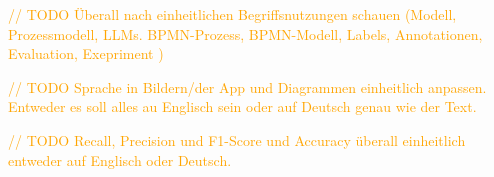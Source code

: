 \textcolor{orange}{// TODO Überall nach einheitlichen Begriffsnutzungen schauen (Modell, Prozessmodell, LLMs. BPMN-Prozess, BPMN-Modell, Labels, Annotationen, Evaluation, Exepriment )}

\textcolor{orange}{// TODO Sprache in Bildern/der App und Diagrammen einheitlich anpassen. Entweder es soll alles au Englisch sein oder auf Deutsch genau wie der Text.}

\textcolor{orange}{// TODO Recall, Precision und F1-Score und Accuracy überall einheitlich entweder auf Englisch oder Deutsch.}













